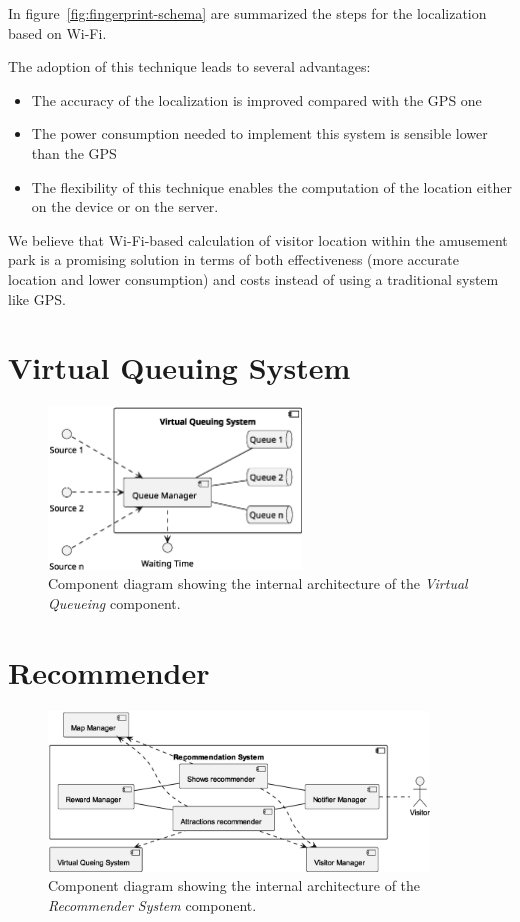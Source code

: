 In figure~\ref{fig:fingerprint-schema} are summarized the steps for the localization based on Wi-Fi.

The adoption of this technique leads to several advantages:
\begin{itemize}
	\item The accuracy of the localization is improved compared with the GPS one~\cite{du2018hybrid}
	\item The power consumption needed to implement this system is sensible lower than the GPS~\cite{du2018hybrid}
	\item The flexibility of this technique enables the computation of the location either on the device or on the server.
\end{itemize}

We believe that Wi-Fi-based calculation of visitor location within the amusement park is a promising solution in terms of both effectiveness
(more accurate location and lower consumption) and costs instead of using a traditional system like GPS.


\section{Virtual Queuing System}
\begin{figure}[H]
	\centering
	\includegraphics[width=0.6\textwidth]{img/virtual-queuing.eps}
	\caption{Component diagram showing the internal architecture of the \textit{Virtual Queueing} component.
	}
	\label{fig:virtual-queueing-arch}
\end{figure}

\section{Recommender}

\begin{figure}[H]
	\centering
	\includegraphics[width=0.9\textwidth]{img/recommender.eps}
	\caption{Component diagram showing the internal architecture of the \textit{Recommender System} component.
	}
	\label{fig:recommender-arch}
\end{figure}

